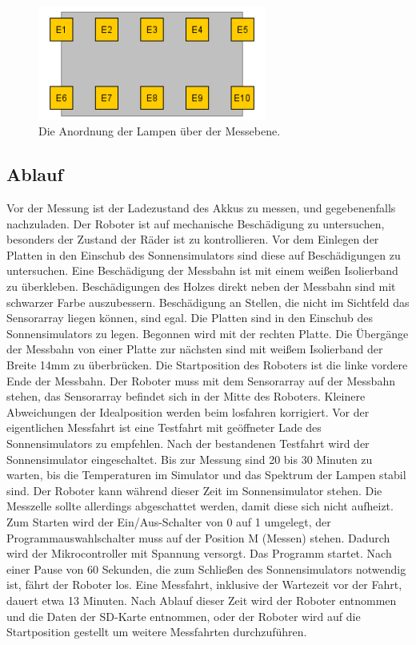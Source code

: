 \documentclass[a4paper,bibtotoc,oneside]{scrbook}
\begin{document}
\begin{figure}[htbp]
\centering
\includegraphics[width=75mm]{img/lampen.png}
\caption{Die Anordnung der Lampen über der Messebene.}\label{Lampen}
\end{figure}


\subsection{Ablauf}\thispagestyle{empty}
Vor der Messung ist der Ladezustand des Akkus zu messen, und gegebenenfalls nachzuladen. Der Roboter ist auf mechanische Beschädigung zu untersuchen, besonders der Zustand der Räder ist zu kontrollieren.
Vor dem Einlegen der Platten in den Einschub des Sonnensimulators sind diese auf Beschädigungen zu untersuchen. Eine Beschädigung der Messbahn ist mit einem weißen Isolierband zu überkleben. Beschädigungen des Holzes direkt neben der Messbahn sind mit schwarzer Farbe auszubessern. Beschädigung an Stellen, die nicht im Sichtfeld das Sensorarray liegen können, sind egal.
Die Platten sind in den Einschub des Sonnensimulators zu legen. Begonnen wird mit der rechten Platte. Die Übergänge der Messbahn von einer Platte zur nächsten sind mit weißem Isolierband  der Breite 14mm zu überbrücken. 
Die Startposition des Roboters ist die linke vordere Ende der Messbahn. Der Roboter muss mit dem Sensorarray auf der Messbahn stehen, das Sensorarray befindet sich in der Mitte des Roboters. Kleinere Abweichungen der Idealposition werden beim losfahren korrigiert. 
Vor der eigentlichen Messfahrt ist eine Testfahrt mit geöffneter Lade des Sonnensimulators zu empfehlen. 
Nach der bestandenen Testfahrt wird der Sonnensimulator eingeschaltet. Bis zur Messung sind 20 bis 30 Minuten zu warten, bis die Temperaturen im Simulator und das Spektrum der Lampen stabil sind. Der Roboter kann während dieser Zeit im Sonnensimulator stehen. Die Messzelle sollte allerdings abgeschattet werden, damit diese sich nicht aufheizt. 
Zum Starten wird der Ein/Aus-Schalter von 0 auf 1 umgelegt, der Programmauswahlschalter muss auf der Position M (Messen) stehen. Dadurch wird der Mikrocontroller mit Spannung versorgt. Das Programm startet. Nach einer Pause von 60 Sekunden, die zum Schließen des Sonnensimulators notwendig ist, fährt der Roboter los. Eine Messfahrt, inklusive der Wartezeit vor der Fahrt, dauert etwa 13 Minuten. Nach Ablauf dieser Zeit wird der Roboter entnommen und die Daten der SD-Karte entnommen, oder der Roboter wird auf die Startposition gestellt um weitere Messfahrten durchzuführen.
\end{document}
